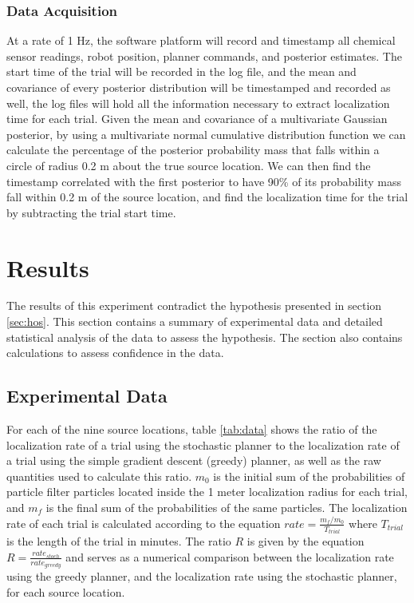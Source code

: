 \documentclass[submit]{aiaa-pretty-modified}
\begin{document}
\subsubsection{Data Acquisition}
At a rate of 1 Hz, the software platform will record and
timestamp all chemical sensor readings, robot position, planner commands, and
posterior estimates. The start time of the trial will be recorded
in the log file, and the mean and covariance of every posterior
distribution will be timestamped and recorded as well, the log files will hold all the
information necessary to extract localization time for each trial.
Given the mean and covariance of a multivariate Gaussian
posterior, by using a multivariate normal cumulative distribution
function we can calculate the percentage of the posterior probability
mass that falls within a circle of radius 0.2 m about the true source
location. We can then find the timestamp correlated with the first
posterior to have 90\% of its probability mass fall within 0.2 m of
the source location, and find the localization time for the trial by
subtracting the trial start time.

\section{Results}
\label{sec:results}
The results of this experiment contradict the hypothesis presented in
section \ref{sec:hos}.  This section contains  a summary of experimental data
and detailed statistical analysis of the data to assess the
hypothesis.  The section also contains calculations to assess
confidence in the data.

\subsection{Experimental Data}
For each of the nine source locations, table \ref{tab:data} shows the
ratio of the localization rate of
a trial using the stochastic planner to the localization rate of
a trial using the simple gradient descent (greedy) planner, as well as
the raw quantities used to calculate this ratio. $m_0$ is the initial sum of
the probabilities of particle filter particles located inside the 1
meter localization radius for each trial, and $m_f$ is the final sum
of the probabilities of the same particles. The localization rate of
each trial is calculated according to the equation $rate =
\frac{m_f/m_0}{T_{trial}}$ where $T_{trial}$ is the length of the
trial in minutes.  The ratio $R$ is given by the equation $R =
\frac{rate_{stoch}}{rate_{greedy}}$ and serves as a numerical
comparison between the localization rate using the greedy planner, and
the localization rate using the stochastic planner, for each source location.
\end{document}
